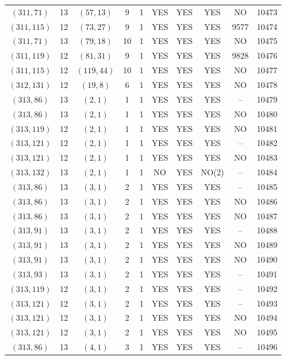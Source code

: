 \begin{longtable}{|c|c|c|c|c|c|c|c|c|c|}
$(311, 71)$ & 13 & $(57, 13)$ & 9 & 1 & YES & YES & YES & NO & 10473\\
$(311, 115)$ & 12 & $(73, 27)$ & 9 & 1 & YES & YES & YES & 9577 & 10474\\
$(311, 71)$ & 13 & $(79, 18)$ & 10 & 1 & YES & YES & YES & NO & 10475\\
$(311, 119)$ & 12 & $(81, 31)$ & 9 & 1 & YES & YES & YES & 9828 & 10476\\
$(311, 115)$ & 12 & $(119, 44)$ & 10 & 1 & YES & YES & YES & NO & 10477\\
$(312, 131)$ & 12 & $(19, 8)$ & 6 & 1 & YES & YES & YES & NO & 10478\\
$(313, 86)$ & 13 & $(2, 1)$ & 1 & 1 & YES & YES & YES & -- & 10479\\
$(313, 86)$ & 13 & $(2, 1)$ & 1 & 1 & YES & YES & YES & NO & 10480\\
$(313, 119)$ & 12 & $(2, 1)$ & 1 & 1 & YES & YES & YES & NO & 10481\\
$(313, 121)$ & 12 & $(2, 1)$ & 1 & 1 & YES & YES & YES & -- & 10482\\
$(313, 121)$ & 12 & $(2, 1)$ & 1 & 1 & YES & YES & YES & NO & 10483\\
$(313, 132)$ & 13 & $(2, 1)$ & 1 & 1 & NO & YES & NO(2) & -- & 10484\\
$(313, 86)$ & 13 & $(3, 1)$ & 2 & 1 & YES & YES & YES & -- & 10485\\
$(313, 86)$ & 13 & $(3, 1)$ & 2 & 1 & YES & YES & YES & NO & 10486\\
$(313, 86)$ & 13 & $(3, 1)$ & 2 & 1 & YES & YES & YES & NO & 10487\\
$(313, 91)$ & 13 & $(3, 1)$ & 2 & 1 & YES & YES & YES & -- & 10488\\
$(313, 91)$ & 13 & $(3, 1)$ & 2 & 1 & YES & YES & YES & NO & 10489\\
$(313, 91)$ & 13 & $(3, 1)$ & 2 & 1 & YES & YES & YES & NO & 10490\\
$(313, 93)$ & 13 & $(3, 1)$ & 2 & 1 & YES & YES & YES & -- & 10491\\
$(313, 119)$ & 12 & $(3, 1)$ & 2 & 1 & YES & YES & YES & -- & 10492\\
$(313, 121)$ & 12 & $(3, 1)$ & 2 & 1 & YES & YES & YES & -- & 10493\\
$(313, 121)$ & 12 & $(3, 1)$ & 2 & 1 & YES & YES & YES & NO & 10494\\
$(313, 121)$ & 12 & $(3, 1)$ & 2 & 1 & YES & YES & YES & NO & 10495\\
$(313, 86)$ & 13 & $(4, 1)$ & 3 & 1 & YES & YES & YES & -- & 10496\\

\end{longtable}
